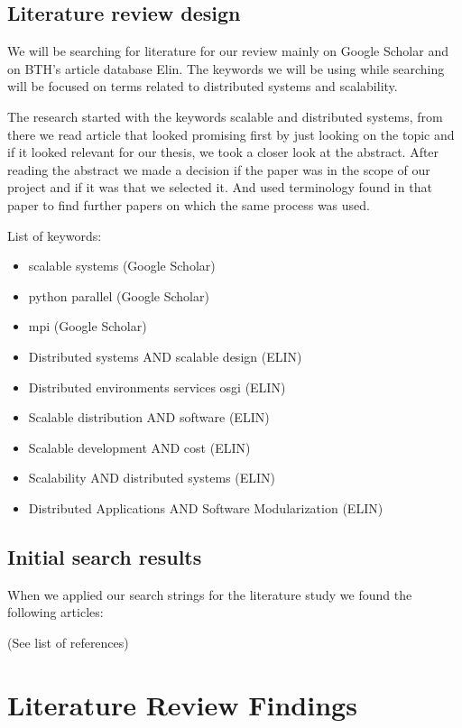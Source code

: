 \documentclass{article}
\begin{document}
{\subsection{Literature review design}

We will be searching for literature for our review mainly on Google Scholar and
on BTH's article database Elin. The keywords we will be using while searching 
will be focused on terms related to distributed systems and scalability.

The research started with the keywords scalable and distributed systems,
from there we read article that looked promising first by just looking on
the topic and if it looked relevant for our thesis, we took a closer look
at the abstract. After reading the abstract we made a decision if the paper
was in the scope of our project and if it was that we selected it. And used
terminology found in that paper to find further papers on which the same 
process was used. 
\newline

List of keywords:
\begin{itemize}
\item{scalable systems (Google Scholar)}
\item{python parallel (Google Scholar)}
\item{mpi (Google Scholar)}
\item{Distributed systems AND scalable design (ELIN)}
\item{Distributed environments services osgi (ELIN)}
\item{Scalable distribution AND software (ELIN)}
\item{Scalable development AND cost (ELIN)}
\item{Scalability AND distributed systems (ELIN)}
\item{Distributed Applications AND Software Modularization (ELIN)}
\end{itemize}

\subsection{Initial search results}
When we applied our search strings for the literature study we found the
following articles:

(See list of references)

\section{Literature Review Findings}

}
\end{document}
